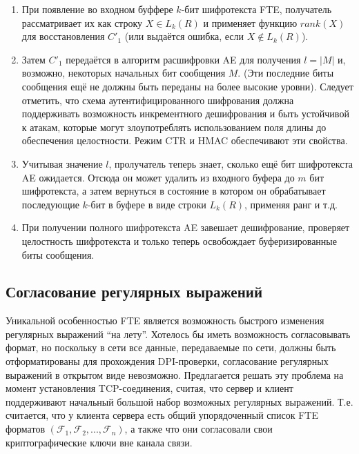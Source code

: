 \begin{enumerate}
    \item При появление во входном буффере $k$-бит шифротекста FTE,
          получатель рассматривает их как строку $X \in L_k(R)$ и применяет функцию $rank(X)$ для восстановления $C'_1$ (или выдаётся ошибка, если $X \notin L_k(R)$).
    \item Затем $C'_1$ передаётся в алгоритм расшифровки AE для получения $l = |M|$ и, возможно, некоторых начальных бит сообщения $M$.
          (Эти последние биты сообщения ещё не должны быть переданы на более высокие уровни).
          Следует отметить, что схема аутентифицированного шифрования должна поддерживать возможность инкрементного дешифрования
          и быть устойчивой к атакам, которые могут злоупотреблять использованием поля длины до обеспечения целостности. Режим CTR и HMAC обеспечивают эти свойства.
    \item Учитывая значение $l$, пролучатель теперь знает, сколько ещё бит шифротекста AE ожидается.
          Отсюда он может удалить из входного буфера до $m$ бит шифротекста,
          а затем вернуться в состояние в котором он обрабатывает последующие $k$-бит в буфере в виде строки $L_k(R)$, применяя ранг и т.д.
    \item При получении полного шифротекста AE завешает дешифрование, проверяет целостность шифротекста
          и только теперь освобождает буферизированные биты сообщения.
\end{enumerate}

\subsection{Согласование регулярных выражений}

Уникальной особенностью FTE является возможность быстрого изменения регулярных выражений ``на лету''.
Хотелось бы иметь возможность согласовывать формат, но поскольку в сети все данные, передаваемые по сети,
должны быть отформатированы для прохождения DPI-проверки, согласование регулярных выражений в открытом виде невозможно.
Предлагается решать эту проблема на момент установления TCP-соединения, считая,
что сервер и клиент поддерживают начальный большой набор возможных регулярных выражений.
Т.е. считается, что у клиента сервера есть общий упорядоченный список FTE форматов $(\mathcal{F}_1, \mathcal{F}_2, ..., \mathcal{F}_n)$,
а также что они согласовали свои криптографические ключи вне канала связи.

